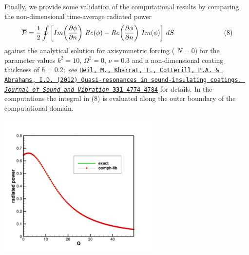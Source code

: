 Finally, we provide some validation of the computational results by comparing the non-\/dimensional time-\/average radiated power \[ \overline{\cal P} = \frac{1}{2} \oint\bigg[Im\bigg(\frac{\partial \phi}{\partial n}\bigg) \ Re(\phi) - Re\bigg(\frac{\partial \phi}{\partial n}\bigg) \ Im(\phi) \bigg] \ dS \ \ \ \ \ \ \ \ \ \ \ \ \ \ \ \ \ \ \ \ \ \ (8) \] against the analytical solution for axisymmetric forcing ( $ N=0 $) for the parameter values $ k^2 = 10 $, $ \Omega^2 = 0 $, $ \nu =0.3 $ and a non-\/dimensional coating thickness of $ h = 0.2; $ see \href{http://dx.doi.org/10.1016/j.jsv.2012.05.029}{\tt Heil, M., Kharrat, T., Cotterill, P.\+A. \& Abrahams, I.\+D. (2012) Quasi-\/resonances in sound-\/insulating coatings. {\itshape Journal of Sound and Vibration} {\bfseries 331} 4774-\/4784} for details. In the computations the integral in (8) is evaluated along the outer boundary of the computational domain.

 
\begin{DoxyImage}
\includegraphics[width=0.6\textwidth]{trace}
\end{DoxyImage}




 

